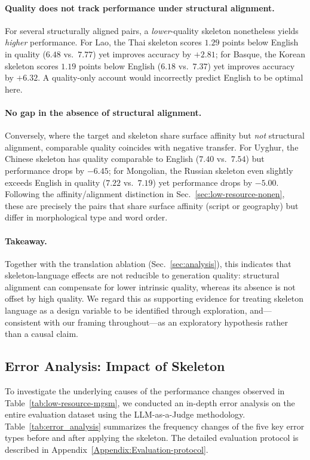 \paragraph{Quality does not track performance under structural alignment.}
For several structurally aligned pairs, a \emph{lower}-quality skeleton nonetheless yields \emph{higher} performance. For Lao, the Thai skeleton scores $1.29$ points below English in quality ($6.48$ vs.\ $7.77$) yet improves accuracy by $+2.81$; for Basque, the Korean skeleton scores $1.19$ points below English ($6.18$ vs.\ $7.37$) yet improves accuracy by $+6.32$. A quality-only account would incorrectly predict English to be optimal here.

\paragraph{No gap in the absence of structural alignment.}
Conversely, where the target and skeleton share surface affinity but \emph{not} structural alignment, comparable quality coincides with negative transfer. For Uyghur, the Chinese skeleton has quality comparable to English ($7.40$ vs.\ $7.54$) but performance drops by $-6.45$; for Mongolian, the Russian skeleton even slightly exceeds English in quality ($7.22$ vs.\ $7.19$) yet performance drops by $-5.00$. Following the affinity/alignment distinction in Sec.~\ref{sec:low-resource-nonen}, these are precisely the pairs that share surface affinity (script or geography) but differ in morphological type and word order.

\paragraph{Takeaway.}
Together with the translation ablation (Sec.~\ref{sec:analysis}), this indicates that skeleton-language effects are not reducible to generation quality: structural alignment can compensate for lower intrinsic quality, whereas its absence is not offset by high quality. We regard this as supporting evidence for treating skeleton language as a design variable to be identified through exploration, and---consistent with our framing throughout---as an exploratory hypothesis rather than a causal claim.


\subsection{Error Analysis: Impact of Skeleton}

To investigate the underlying causes of the performance changes observed in Table~\ref{tab:low-resource-mgsm}, we conducted an in-depth error analysis on the entire evaluation dataset using the LLM-as-a-Judge methodology. Table~\ref{tab:error_analysis} summarizes the frequency changes of the five key error types before and after applying the skeleton. The detailed evaluation protocol is described in Appendix~\ref{Appendix:Evaluation-protocol}.

